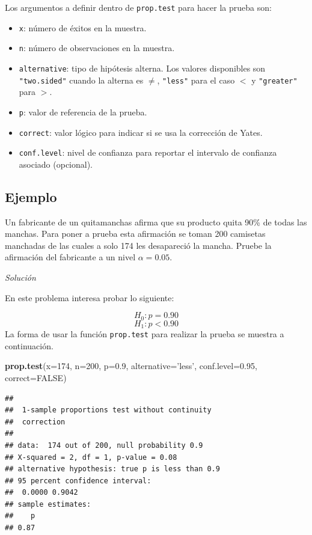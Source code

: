 \documentclass[10pt,]{krantz}
\makeatletter
\newenvironment{Shaded}{\begin{snugshade}}{\end{snugshade}}
\newcommand{\KeywordTok}[1]{\textcolor[rgb]{0.13,0.29,0.53}{\textbf{#1}}}
\newcommand{\DataTypeTok}[1]{\textcolor[rgb]{0.13,0.29,0.53}{#1}}
\newcommand{\DecValTok}[1]{\textcolor[rgb]{0.00,0.00,0.81}{#1}}
\newcommand{\FloatTok}[1]{\textcolor[rgb]{0.00,0.00,0.81}{#1}}
\newcommand{\StringTok}[1]{\textcolor[rgb]{0.31,0.60,0.02}{#1}}
\newcommand{\OtherTok}[1]{\textcolor[rgb]{0.56,0.35,0.01}{#1}}
\newcommand{\NormalTok}[1]{#1}
\providecommand{\tightlist}{%
  \setlength{\itemsep}{0pt}\setlength{\parskip}{0pt}}
\newenvironment{kframe}{%
\medskip{}
\setlength{\fboxsep}{.8em}
 \def\at@end@of@kframe{}%
 \ifinner\ifhmode%
  \def\at@end@of@kframe{\end{minipage}}%
  \begin{minipage}{\columnwidth}%
 \fi\fi%
 \def\FrameCommand##1{\hskip\@totalleftmargin \hskip-\fboxsep
 \colorbox{shadecolor}{##1}\hskip-\fboxsep
     \hskip-\linewidth \hskip-\@totalleftmargin \hskip\columnwidth}%
 \MakeFramed {\advance\hsize-\width
   \@totalleftmargin\z@ \linewidth\hsize
   \@setminipage}}%
 {\par\unskip\endMakeFramed%
 \at@end@of@kframe}
\renewenvironment{Shaded}{\begin{kframe}}{\end{kframe}}
\makeatother
\begin{document}
Los argumentos a definir dentro de \texttt{prop.test} para hacer la
prueba son:

\begin{itemize}
\tightlist
\item
  \texttt{x}: número de éxitos en la muestra.
\item
  \texttt{n}: número de observaciones en la muestra.
\item
  \texttt{alternative}: tipo de hipótesis alterna. Los valores
  disponibles son \texttt{"two.sided"} cuando la alterna es \(\neq\),
  \texttt{"less"} para el caso \(<\) y \texttt{"greater"} para \(>\).
\item
  \texttt{p}: valor de referencia de la prueba.
\item
  \texttt{correct}: valor lógico para indicar si se usa la corrección de
  Yates.
\item
  \texttt{conf.level}: nivel de confianza para reportar el intervalo de
  confianza asociado (opcional).
\end{itemize}

\subsection*{Ejemplo}\label{ejemplo-65}


Un fabricante de un quitamanchas afirma que su producto quita 90\% de
todas las manchas. Para poner a prueba esta afirmación se toman 200
camisetas manchadas de las cuales a solo 174 les desapareció la mancha.
Pruebe la afirmación del fabricante a un nivel \(\alpha=0.05\).

\emph{Solución}

En este problema interesa probar lo siguiente:

\[H_0: p = 0.90\] \[H_1: p < 0.90\] La forma de usar la función
\texttt{prop.test} para realizar la prueba se muestra a continuación.

\begin{Shaded}
\begin{Highlighting}[]
\KeywordTok{prop.test}\NormalTok{(}\DataTypeTok{x=}\DecValTok{174}\NormalTok{, }\DataTypeTok{n=}\DecValTok{200}\NormalTok{, }\DataTypeTok{p=}\FloatTok{0.9}\NormalTok{, }\DataTypeTok{alternative=}\StringTok{'less'}\NormalTok{,}
          \DataTypeTok{conf.level=}\FloatTok{0.95}\NormalTok{, }\DataTypeTok{correct=}\OtherTok{FALSE}\NormalTok{)}
\end{Highlighting}
\end{Shaded}

\begin{verbatim}
## 
##  1-sample proportions test without continuity
##  correction
## 
## data:  174 out of 200, null probability 0.9
## X-squared = 2, df = 1, p-value = 0.08
## alternative hypothesis: true p is less than 0.9
## 95 percent confidence interval:
##  0.0000 0.9042
## sample estimates:
##    p 
## 0.87
\end{verbatim}
\end{document}
